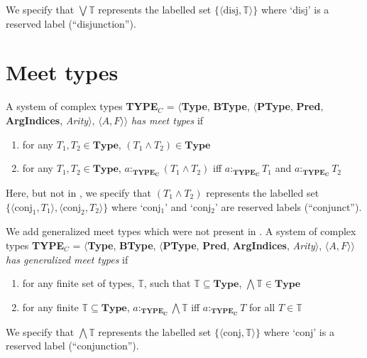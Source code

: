 We specify that $\bigvee\mathbb{T}$
represents the labelled set
$\{\langle\mathrm{disj},\mathbb{T}\rangle\}$
where `disj' is a reserved label (``disjunction'').

\section{Meet types}
\label{app:meettypes}

A system of complex types \textbf{TYPE}$_C$ = $\langle${\bf Type}, {\bf BType},
$\langle$\textbf{PType}, {\bf Pred}, \textbf{ArgIndices}, {\it
  Arity\/}$\rangle$, $\langle A,F\rangle$$\rangle$ \textit{has meet types} if
\begin{enumerate} 
 
\item for any $T_1,T_2 \in \mathbf{Type}$, $(T_1\wedge T_2) \in \mathbf{Type}$ 
 
\item for any $T_1,T_2 \in \mathbf{Type}$, $a:_{\mathbf{TYPE_C}}(T_1\wedge T_2)$ iff
  $a:_{\mathbf{TYPE_C}}T_1$ and $a:_{\mathbf{TYPE_C}}T_2$ 

\end{enumerate}

Here, but not in \cite{Cooper2012}, we specify that $(T_1\wedge T_2)$
represents the labelled set
$\{\langle\mathrm{conj}_1,T_1\rangle,\langle\mathrm{conj_2},T_2\rangle\}$
where `conj$_1$' and `conj$_2$' are reserved labels (``conjunct'').

We add generalized meet types which were not present in
\cite{Cooper2012}.  A system of complex types {\bf TYPE$_C$} = $\langle${\bf Type}, {\bf BType},
$\langle$\textbf{PType}, {\bf Pred}, \textbf{ArgIndices}, {\it
  Arity\/}$\rangle$, $\langle A,F\rangle$$\rangle$ \textit{has
  generalized meet
  types} if 

\begin{enumerate} 
 
\item for any finite set of types, $\mathbb{T}$, such that $\mathbb{T}
  \subseteq\mathbf{Type}$, $\bigwedge\mathbb{T} \in \mathbf{Type}$ 
 
\item for any finite $\mathbb{T} \subseteq\mathbf{Type}$, $a:_{\mathbf{TYPE_C}}\bigwedge\mathbb{T}$ iff
  $a:_{\mathbf{TYPE_C}}T$ for all $T\in\mathbb{T}$
 
\end{enumerate}

We specify that $\bigwedge\mathbb{T}$
represents the labelled set
$\{\langle\mathrm{conj},\mathbb{T}\rangle\}$
where `conj' is a reserved label (``conjunction'').


